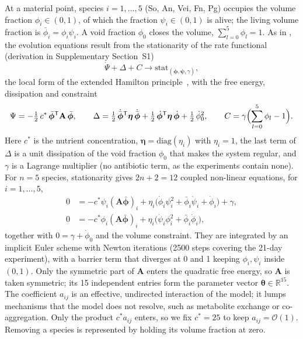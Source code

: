 \documentclass[preprint,12pt]{elsarticle}
\newcommand{\btheta}{\boldsymbol{\theta}}
\newcommand{\bphi}{\boldsymbol{\phi}}
\newcommand{\bpsi}{\boldsymbol{\psi}}
\begin{document}
At a material point, species $i=1,\dots,5$ (So, An, Vei, Fn, Pg) occupies the volume fraction $\phi_i\in(0,1)$, of which the fraction $\psi_i\in(0,1)$ is alive; the living volume fraction is $\bar\phi_i=\phi_i\psi_i$.
A void fraction $\phi_0$ closes the volume, $\sum_{l=0}^{5}\phi_l=1$.
As in \citet{Klempt2025ContinuumBiofilm}, the evolution equations result from the stationarity of the rate functional (derivation in Supplementary Section~S1)
\begin{equation}
\dot\Psi+\Delta+C\rightarrow\mathrm{stat}_{(\dot{\bphi},\dot{\bpsi},\gamma)},
\label{eq:stat}
\end{equation}
the local form of the extended Hamilton principle~\citep{JunkerBalzani2021ExtendedHamilton, JunkerBodeHackl2025Holistic, junker2014principle, hackl1997generalized}, with the free energy, dissipation and constraint
\begin{equation}
\Psi=-\tfrac12\,c^*\,\bar{\bphi}^{\mathsf T}\mathbf{A}\,\bar{\bphi},\qquad
\Delta=\tfrac12\,\dot{\bar{\bphi}}^{\mathsf T}\boldsymbol\eta\,\dot{\bar{\bphi}}+\tfrac12\,\dot{\bphi}^{\mathsf T}\boldsymbol\eta\,\dot{\bphi}+\tfrac12\,\dot\phi_0^2,\qquad
C=\gamma\Bigl(\sum_{l=0}^{5}\phi_l-1\Bigr).
\label{eq:potentials}
\end{equation}
Here $c^*$ is the nutrient concentration, $\boldsymbol\eta=\mathrm{diag}(\eta_i)$ with $\eta_i=1$, the last term of $\Delta$ is a unit dissipation of the void fraction $\phi_0$ that makes the system regular, and $\gamma$ is a Lagrange multiplier (no antibiotic term, as the experiments contain none).
For $n=5$ species, stationarity gives $2n+2=12$ coupled non-linear equations, for $i=1,\dots,5$,
\begin{align}
0&=-c^*\psi_i(\mathbf{A}\bar{\bphi})_i+\eta_i\bigl(\dot\phi_i\psi_i^2+\bar\phi_i\dot\psi_i+\dot\phi_i\bigr)+\gamma,\label{eq:phi}\\
0&=-c^*\phi_i(\mathbf{A}\bar{\bphi})_i+\eta_i\bigl(\dot\psi_i\phi_i^2+\bar\phi_i\dot\phi_i\bigr),\label{eq:psi}
\end{align}
together with $0=\gamma+\dot\phi_0$ and the volume constraint.
They are integrated by an implicit Euler scheme with Newton iterations (2500 steps covering the 21-day experiment), with a barrier term that diverges at 0 and 1 keeping $\phi_i,\psi_i$ inside $(0,1)$.
Only the symmetric part of $\mathbf{A}$ enters the quadratic free energy, so $\mathbf{A}$ is taken symmetric; its 15 independent entries form the parameter vector $\btheta\in\mathbb{R}^{15}$.
The coefficient $a_{ij}$ is an effective, undirected interaction of the model; it lumps mechanisms that the model does not resolve, such as metabolite exchange or co-aggregation.
Only the product $c^*a_{ij}$ enters, so we fix $c^*=25$ to keep $a_{ij}=\mathcal{O}(1)$.
Removing a species is represented by holding its volume fraction at zero.
\end{document}
